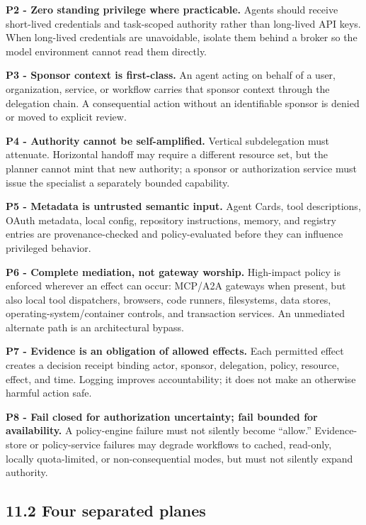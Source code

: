 \documentclass[
  10pt,
  letterpaper,
]{article}
\begin{document}
\textbf{P2 - Zero standing privilege where practicable.} Agents should
receive short-lived credentials and task-scoped authority rather than
long-lived API keys. When long-lived credentials are unavoidable,
isolate them behind a broker so the model environment cannot read them
directly.

\textbf{P3 - Sponsor context is first-class.} An agent acting on behalf
of a user, organization, service, or workflow carries that sponsor
context through the delegation chain. A consequential action without an
identifiable sponsor is denied or moved to explicit review.

\textbf{P4 - Authority cannot be self-amplified.} Vertical subdelegation
must attenuate. Horizontal handoff may require a different resource set,
but the planner cannot mint that new authority; a sponsor or
authorization service must issue the specialist a separately bounded
capability.

\textbf{P5 - Metadata is untrusted semantic input.} Agent Cards, tool
descriptions, OAuth metadata, local config, repository instructions,
memory, and registry entries are provenance-checked and policy-evaluated
before they can influence privileged behavior.

\textbf{P6 - Complete mediation, not gateway worship.} High-impact
policy is enforced wherever an effect can occur: MCP/A2A gateways when
present, but also local tool dispatchers, browsers, code runners,
filesystems, data stores, operating-system/container controls, and
transaction services. An unmediated alternate path is an architectural
bypass.

\textbf{P7 - Evidence is an obligation of allowed effects.} Each
permitted effect creates a decision receipt binding actor, sponsor,
delegation, policy, resource, effect, and time. Logging improves
accountability; it does not make an otherwise harmful action safe.

\textbf{P8 - Fail closed for authorization uncertainty; fail bounded for
availability.} A policy-engine failure must not silently become
``allow.'' Evidence-store or policy-service failures may degrade
workflows to cached, read-only, locally quota-limited, or
non-consequential modes, but must not silently expand authority.

\subsection{11.2 Four separated planes}\label{four-separated-planes}
\end{document}
